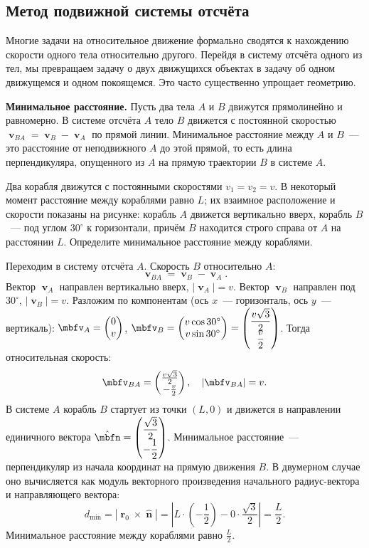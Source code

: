 \documentclass[../main.tex]{subfiles}
\begin{document}
\subsection{Метод подвижной системы отсчёта}

Многие задачи на относительное движение формально сводятся
к нахождению скорости одного тела относительно другого.
Перейдя в систему отсчёта одного из тел, мы превращаем
задачу о двух движущихся объектах в задачу об одном движущемся
и одном покоящемся. Это часто существенно упрощает геометрию.

\noindent\textbf{Минимальное расстояние.}
Пусть два тела $A$ и $B$ движутся прямолинейно и равномерно.
В системе отсчёта $A$ тело $B$ движется с постоянной скоростью
$\mbfv_{BA} = \mbfv_B - \mbfv_A$ по прямой линии.
Минимальное расстояние между $A$ и $B$~--- это расстояние
от неподвижного $A$ до этой прямой, то есть длина перпендикуляра,
опущенного из $A$ на прямую траектории $B$ в системе $A$.

\begin{example}
Два корабля движутся с постоянными скоростями $v_1 = v_2 = v$.
В некоторый момент расстояние между кораблями равно $L$;
их взаимное расположение и скорости показаны на рисунке:
корабль $A$ движется вертикально вверх, корабль $B$~---
под углом $30^\circ$ к горизонтали, причём $B$ находится строго
справа от $A$ на расстоянии $L$. Определите минимальное
расстояние между кораблями.

Переходим в систему отсчёта $A$. Скорость $B$ относительно $A$:
\[
    \mbfv_{BA} = \mbfv_B - \mbfv_A.
\]
Вектор $\mbfv_A$ направлен вертикально вверх, $|\mbfv_A| = v$.
Вектор $\mbfv_B$ направлен под $30^\circ$, $|\mbfv_B| = v$.
Разложим по компонентам (ось $x$~--- горизонталь, ось $y$~--- вертикаль):
$\mbfv_A = \colvecii{0}{v}$, $\mbfv_B = \colvecii{v\cos 30^\circ}{v\sin 30^\circ} = \colvecii{\dfrac{v\sqrt{3}}{2}}{\dfrac{v}{2}}$.
Тогда относительная скорость:
\[
    \mbfv_{BA} = \colvecii{\frac{v\sqrt{3}}{2}}{-\frac{v}{2}},
    \quad |\mbfv_{BA}| = v.
\]
В системе $A$ корабль $B$ стартует из точки $(L, 0)$
и движется в направлении единичного вектора
$\hat{\mbfn} = \colvecii{\dfrac{\sqrt{3}}{2}}{-\dfrac{1}{2}}$.
Минимальное расстояние~--- перпендикуляр из начала координат
на прямую движения $B$. В двумерном случае оно вычисляется как
модуль векторного произведения начального радиус-вектора
и направляющего вектора:
\[
    d_{\min} = \left| \mbfr_0 \times \hat{\mbfn} \right|
             = \left| L \cdot \left(-\frac{1}{2}\right) - 0 \cdot \frac{\sqrt{3}}{2} \right|
             = \frac{L}{2}.
\]
Минимальное расстояние между кораблями равно $\frac{L}{2}$.
\end{example}
\end{document}

